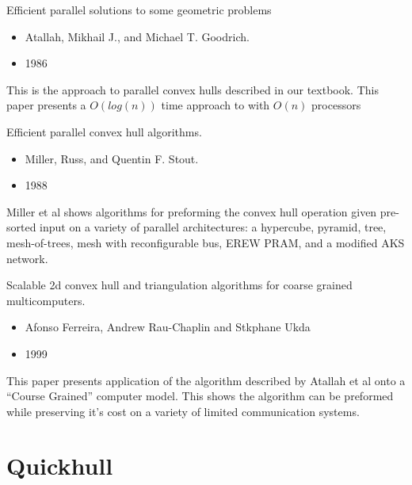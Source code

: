 \documentclass[11pt]{beamer}
\begin{document}
\begin{frame}{Efficient parallel solutions to some geometric problems}
\begin{itemize}
\item{Atallah, Mikhail J., and Michael T. Goodrich.}
\item{1986}
\end{itemize}
This is the approach to parallel convex hulls described in our textbook.
This paper presents a $O(log(n))$ time approach to with $O(n)$ processors

\end{frame}

\begin{frame}{Efficient parallel convex hull algorithms.}
\begin{itemize}
\item{Miller, Russ, and Quentin F. Stout.}
\item{1988}
\end{itemize}
Miller et al shows algorithms for preforming the convex hull operation given pre-sorted input on a variety of parallel architectures: a hypercube, pyramid,
tree, mesh-of-trees, mesh with reconfigurable bus, EREW PRAM, and a modified AKS network.

\end{frame}



\begin{frame}{Scalable 2d convex hull and triangulation algorithms for coarse grained multicomputers.}
\begin{itemize}
\item{Afonso Ferreira, Andrew Rau-Chaplin and Stkphane Ukda}
\item{1999}
\end{itemize}
This paper presents application of the algorithm described by Atallah et al onto a ``Course Grained'' computer model. This shows the algorithm can be preformed while preserving it's cost on a variety of limited communication systems.

\end{frame}





\section{Quickhull}
\end{document}
